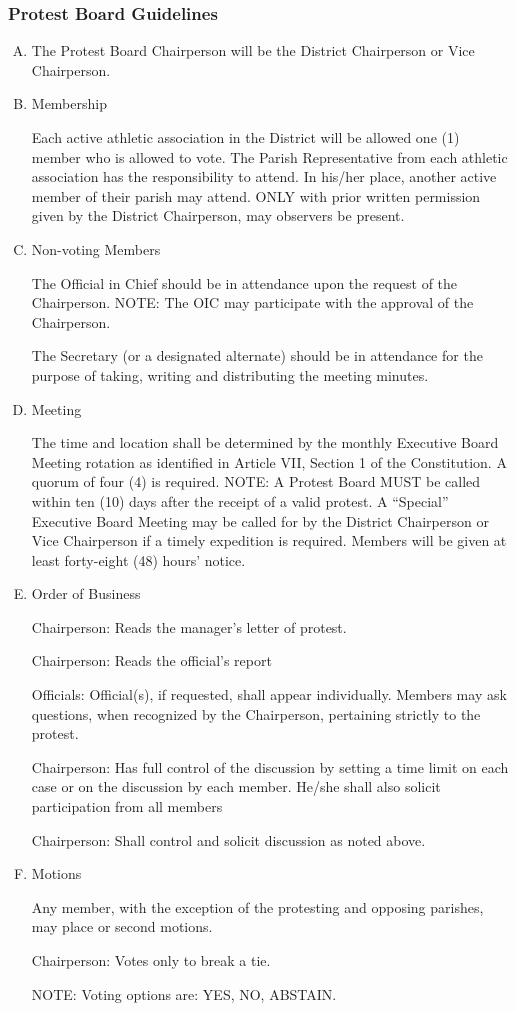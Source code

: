 \documentclass[letteraper,10pt,oneside,draft]{memoir}
\begin{document}
\subsubsection{Protest Board Guidelines}
\begin{enumerate}[A.]
    \item The Protest Board Chairperson will be the District Chairperson or Vice Chairperson.
    \item Membership

    Each active athletic association in the District will be allowed one (1) member who is allowed to vote.  The Parish Representative from each athletic association has the responsibility to attend.  In his/her place, another active member of their parish may attend.  ONLY with prior written permission given by the District Chairperson, may observers be present.
    \item Non-voting Members 

	The Official in Chief should be in attendance upon the request of the Chairperson.  NOTE:  The OIC may participate with the approval of the Chairperson. 

	The Secretary (or a designated alternate) should be in attendance for the purpose of taking, writing and distributing the meeting minutes.  
    \item Meeting   

	The time and location shall be determined by the monthly Executive Board Meeting rotation as identified in Article VII, Section 1 of the Constitution.  A quorum of four (4) is required.  NOTE:  A Protest Board MUST be called within ten (10) days after the receipt of a valid protest.  A “Special” Executive Board Meeting may be called for by the District Chairperson or Vice Chairperson if a timely expedition is required. Members will be given at least forty-eight (48) hours’ notice.

    \item Order of Business
	
       Chairperson:
       Reads the manager's letter of protest.
	
	Chairperson:
       Reads the official's report

       Officials:  
       Official(s), if requested, shall appear individually.  Members may ask questions, when recognized by the 
       Chairperson, pertaining strictly to the protest.

	Chairperson:
       Has full control of the discussion by setting a time limit on each case or on the discussion by each member. 
       He/she shall also solicit participation from all members

	Chairperson:  
       Shall control and solicit discussion as noted above.

    \item Motions

    Any member, with the exception of the protesting and opposing parishes, may place or second motions.

    Chairperson:  Votes only to break a tie.
    
    NOTE:  Voting options are:  YES, NO, ABSTAIN.
\end{enumerate}
\end{document}
